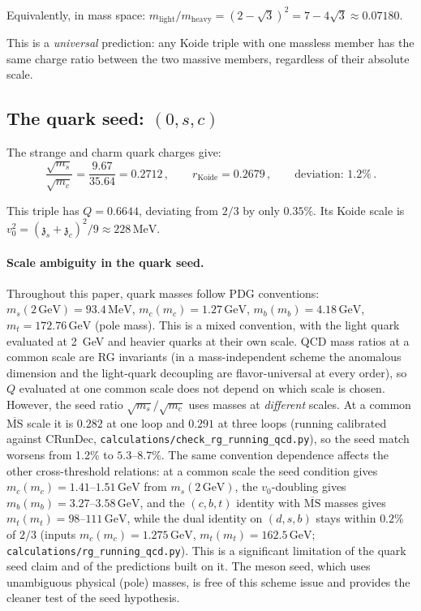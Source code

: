 \documentclass[12pt,a4paper]{article}
\newcommand{\MeV}{\,\text{MeV}}
\newcommand{\GeV}{\,\text{GeV}}
\newcommand{\zch}{\mathfrak{z}}
\begin{document}
Equivalently, in mass space: 
$m_{\text{light}}/m_{\text{heavy}} = (2 - \sqrt{3})^2 = 7 - 4\sqrt{3} 
\approx 0.07180$.

This is a \emph{universal} prediction: any Koide triple with one 
massless member has the same charge ratio between the two massive 
members, regardless of their absolute scale.

\subsection{The quark seed: $(0, s, c)$}

The strange and charm quark charges give:
\begin{equation}
\frac{\sqrt{m_s}}{\sqrt{m_c}} = \frac{9.67}{35.64} = 0.2712\,,
\qquad r_{\text{Koide}} = 0.2679\,, \qquad \text{deviation: } 1.2\%\,.
\end{equation}

This triple has $Q = 0.6644$, deviating from $2/3$ by only $0.35\%$.
Its Koide scale is $v_0^2 = (\zch_s + \zch_c)^2/9 \approx 228\MeV$.

\paragraph{Scale ambiguity in the quark seed.}
Throughout this paper, quark masses follow PDG conventions:
$m_s(2\GeV) = 93.4\MeV$, $m_c(m_c) = 1.27\GeV$,
$m_b(m_b) = 4.18\GeV$, $m_t = 172.76\GeV$ (pole mass). This is a
mixed convention, with the light quark evaluated at 2~GeV and heavier
quarks at their own scale. QCD mass ratios at a common scale are RG
invariants (in a mass-independent scheme the anomalous dimension and the
light-quark decoupling are flavor-universal at every order), so $Q$
evaluated at one common scale does not depend on which scale is chosen.
However, the seed ratio $\sqrt{m_s}/\sqrt{m_c}$ uses masses at
\emph{different} scales. At a common $\overline{\text{MS}}$ scale it is
$0.282$ at one loop and $0.291$ at three loops (running calibrated
against CRunDec, \texttt{calculations/check\_rg\_running\_qcd.py}), so
the seed match worsens from 1.2\% to $5.3$--$8.7\%$. The same convention
dependence affects the other cross-threshold relations: at a common scale
the seed condition gives $m_c(m_c) = 1.41$--$1.51\GeV$ from $m_s(2\GeV)$,
the $v_0$-doubling gives $m_b(m_b) = 3.27$--$3.58\GeV$, and the
$(c,b,t)$ identity with $\overline{\text{MS}}$ masses gives
$m_t(m_t) = 98$--$111\GeV$, while the dual identity on $(d,s,b)$ stays
within $0.2\%$ of $2/3$ (inputs $m_c(m_c) = 1.275\GeV$,
$m_t(m_t) = 162.5\GeV$; \texttt{calculations/rg\_running\_qcd.py}).
This is a significant limitation of the quark seed claim and of the
predictions built on it. The meson
seed, which uses unambiguous physical (pole) masses, is free of this
scheme issue and provides the cleaner test of the seed hypothesis.
\end{document}
